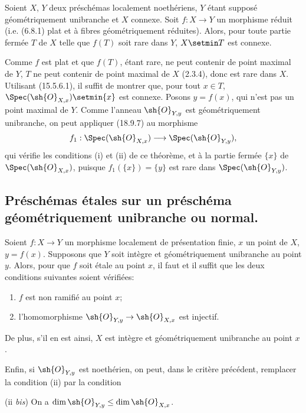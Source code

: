 \begin{corollary}[18.9.11]
\label{IV.18.9.11}
Soient $X$, $Y$ deux préschémas localement noethériens, $Y$ étant supposé géométriquement unibranche et $X$ connexe. Soit $f:X\to Y$ un morphisme réduit \textup{(i.e. (6.8.1) plat et à fibres géométriquement réduites)}. Alors, pour toute partie fermée $T$ de $X$ telle que $f(T)$ soit rare dans $Y$, $X\setmin T$ est connexe.
\end{corollary}

Comme $f$ est plat et que $f(T)$, étant rare, ne peut contenir de point maximal de $Y$, $T$ ne peut contenir de point maximal de $X$ (2.3.4), donc est rare dans $X$. Utilisant (15.5.6.1), il suffit de montrer que, pour tout $x\in T$, $\Spec(\sh{O}_{X,x})\setmin\{x\}$ est connexe. Posons $y=f(x)$, qui n'est pas un point maximal de $Y$. Comme l'anneau $\sh{O}_{Y,y}$ est géométriquement unibranche, on peut appliquer (18.9.7) au morphisme
\[
  f_1:\Spec(\sh{O}_{X,x})\longrightarrow\Spec(\sh{O}_{Y,y}),
\]
qui vérifie les conditions (i) et (ii) de ce théorème, et à la partie fermée $\{x\}$ de $\Spec(\sh{O}_{X,x})$, puisque $f_1(\{x\})=\{y\}$ est rare dans $\Spec(\sh{O}_{Y,y})$.

\subsection{Préschémas étales sur un préschéma géométriquement unibranche ou normal.}

\begin{theorem}[18.10.1]
\label{IV.18.10.1}
Soient $f:X\to Y$ un morphisme localement de présentation finie, $x$ un point de $X$, $y=f(x)$. Supposons que $Y$ soit intègre et géométriquement unibranche au point $y$. Alors, pour que $f$ soit étale au point $x$, il faut et il suffit que les deux conditions suivantes soient vérifiées:
\begin{enumerate}
  \item[\textup{(i)}] $f$ est non ramifié au point $x$;
  \item[\textup{(ii)}] l'homomorphisme $\sh{O}_{Y,y}\to\sh{O}_{X,x}$ est injectif.
\end{enumerate}

De plus, s'il en est ainsi, $X$ est intègre et géométriquement unibranche au point $x$.

Enfin, si $\sh{O}_{Y,y}$ est noethérien, on peut, dans le critère précédent, remplacer la condition \textup{(ii)} par la condition

\textup{(ii \emph{bis})} On a $\dim\sh{O}_{Y,y}\leq\dim\sh{O}_{X,x}$.
\end{theorem}

